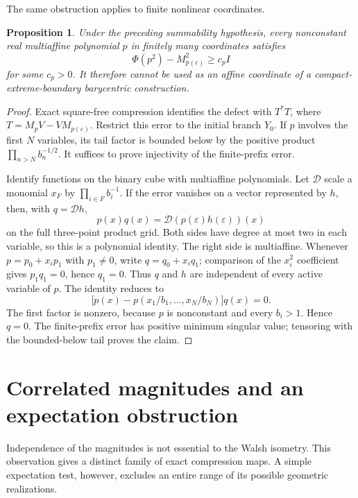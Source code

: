 \documentclass[11pt,letterpaper]{amsart}
\newtheorem{proposition}[theorem]{Proposition}
\theoremstyle{definition}
\theoremstyle{remark}
\numberwithin{equation}{section}
\begin{document}
The same obstruction applies to finite nonlinear coordinates.

\begin{proposition}\label{het:prop:polynomial}
Under the preceding summability hypothesis, every nonconstant real
multiaffine polynomial $p$ in finitely many coordinates satisfies
\[
                    \Phi(p^2)-M_{p(\varepsilon)}^2\ge c_p I
\]
for some $c_p>0$. It therefore cannot be used as an affine coordinate
of a compact-extreme-boundary barycentric construction.
\end{proposition}
\begin{proof}
Exact square-free compression identifies the defect with $T^*T$, where
$T=M_pV-VM_{p(\varepsilon)}$. Restrict this error to the initial branch
$Y_0$. If $p$ involves the first $N$ variables, its tail factor is
bounded below by the positive product $\prod_{n>N}b_n^{-1/2}$.
It suffices to prove injectivity of the finite-prefix error.

Identify functions on the binary cube with multiaffine polynomials.
Let $\mathcal D$ scale a monomial $x_F$ by $\prod_{i\in F}b_i^{-1}$.
If the error vanishes on a vector represented by $h$, then, with
$q=\mathcal Dh$,
\[
                       p(x)q(x)=\mathcal D(p(\varepsilon)h(\varepsilon))(x)
\]
on the full three-point product grid. Both sides have degree at most
two in each variable, so this is a polynomial identity. The right side
is multiaffine. Whenever $p=p_0+x_ip_1$ with $p_1\ne0$, write
$q=q_0+x_iq_1$; comparison of the $x_i^2$ coefficient gives
$p_1q_1=0$, hence $q_1=0$. Thus $q$ and $h$ are independent of every
active variable of $p$. The identity reduces to
\[
        \bigl[p(x)-p(x_1/b_1,\ldots,x_N/b_N)\bigr]q(x)=0.
\]
The first factor is nonzero, because $p$ is nonconstant and every
$b_i>1$. Hence $q=0$. The finite-prefix error has positive minimum
singular value; tensoring with the bounded-below tail proves the claim.
\end{proof}

\section{Correlated magnitudes and an expectation obstruction}
\label{app:correlated}

Independence of the magnitudes is not essential to the Walsh isometry.
This observation gives a distinct family of exact compression maps.
A simple expectation test, however, excludes an entire range of its
possible geometric realizations.
\end{document}
